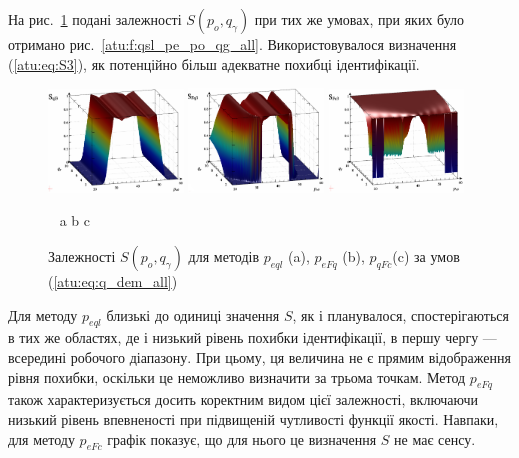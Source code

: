 На рис.~\ref{atu:f:qsl_S_po_qg_all} подані залежності
$S(p_o, q_\gamma)$
при тих же умовах, при яких було отримано рис.~\ref{atu:f:qsl_pe_po_qg_all}.
Використовувалося визначення (\ref{atu:eq:S3}), як
потенційно більш адекватне похибці ідентифікації.

\begin{figure}[htb!]
  \begin{center}
    \includegraphics[width=0.32\textwidth]{p/qls_pe-p_po_qg_Sql_all_xl.png}
    \hfill
    \includegraphics[width=0.32\textwidth]{p/qls_pe-p_po_qg_SFq_all_xl.png}
    \hfill
    \includegraphics[width=0.32\textwidth]{p/qls_pe-p_po_qg_SFc_all_xl.png}
  \end{center}
  \vspace{-1.0ex}
  \begin{center}
    ~ \hfill a \hfill\hfill b \hfill\hfill c \hfill ~
  \end{center}
  \vspace{-1.5ex}
  \caption{Залежності $S(p_o,q_\gamma)$ для методів $p_{eql}$ (a), $p_{eFq}$ (b), $p_{qFc}$(c) за умов (\ref{atu:eq:q_dem_all})}
  \label{atu:f:qsl_S_po_qg_all}
\end{figure}

Для методу $p_{eql}$ близькі до одиниці значення $S$, як і планувалося,
спостерігаються в тих же областях, де і низький рівень похибки ідентифікації, в
першу чергу --- всередині робочого діапазону. При цьому, ця величина не є
прямим відображення рівня похибки, оскільки це неможливо визначити за трьома точкам.
Метод $p_{eFq}$ також характеризується досить коректним видом цієї залежності,
включаючи низький рівень впевненості при підвищеній чутливості функції якості.
Навпаки, для методу $p_{eFc}$ графік показує, що для нього це визначення $S$ не має сенсу.


